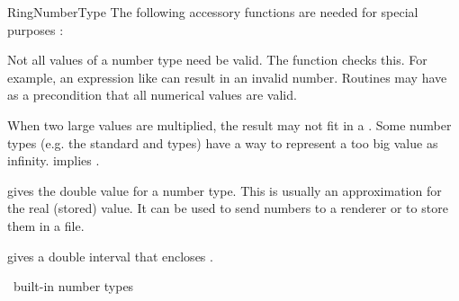\begin{ccRefConcept}{RingNumberType}
The following accessory functions are needed for special purposes :

{Not all values of a number type need be valid. The function
 checks this. For example, an expression like
 can result in an invalid number. Routines may
have as a precondition that all numerical values are valid.}

{ When two large values are multiplied, the result may not fit in a
  . 
  Some number types (e.g. the standard  and  types)
  have a way to represent a too big value as infinity.
   implies .}

         {gives the double value for a number type.
          This is usually an approximation for the real (stored) value.
          It can be used to send numbers to a renderer or to store them 
          in a file.}

         {gives a double interval that encloses .}

\ccHasModels

\CC\ built-in number types \\
 \\
 \\
 \\
 \\
 \\
 \\
 \\
 \\
 \\
 \\
 \\
 \\

\ccSeeAlso
{} \\
 \\
 \\

\end{ccRefConcept}
